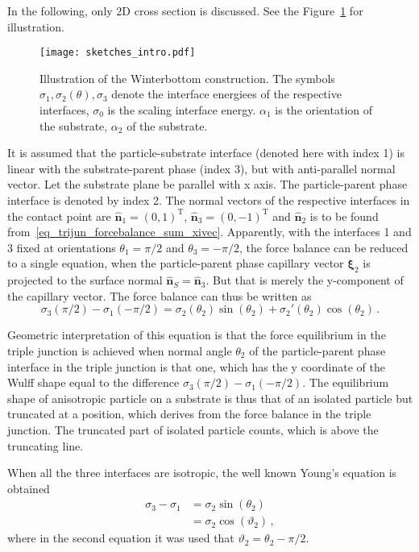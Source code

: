 In the following, only 2D cross section is discussed. See the Figure~\ref{fig_winterbottom_explained_intro} for illustration.
\begin{figure}
	\centering
	\texttt{[image: sketches\_intro.pdf]}
	\caption[Illustration of the Winterbottom construction]{Illustration of the Winterbottom construction. The symbols $\sigma_1, \sigma_2(\theta), \sigma_3$ denote the interface energiees of the respective interfaces, $\sigma_0$ is the scaling interface energy.  $\alpha_1$ is the orientation of the substrate, $\alpha_2$ of the substrate.}
	\label{fig_winterbottom_explained_intro}
\end{figure}
 It is assumed that the particle-substrate interface (denoted here with index 1) is linear with the substrate-parent phase (index 3), but with anti-parallel normal vector. Let the substrate plane be parallel with x axis. The particle-parent phase interface is denoted by index 2. The normal vectors of the respective interfaces in the contact point are $\hat{\bm{n}}_1=(0,1)^{\mathrm{T}}$, $\hat{\bm{n}}_3=(0,-1)^{\mathrm{T}}$ and $\hat{\bm{n}}_2$ is to be found from~\eqref{eq_trijun_forcebalance_sum_xivec}. Apparently, with the interfaces 1 and 3 fixed at orientations $\theta_1=\pi/2$ and $\theta_3=-\pi/2$, the force balance can be reduced to a single equation, when the particle-parent phase capillary vector $\bm{\xi}_2$ is projected to the surface normal $\hat{\bm{n}}_S=\hat{\bm{n}}_3$. But that is merely the y-component of the capillary vector. The force balance can thus be written as
\begin{equation}\label{eq_youngs_eq_aniso}
    \sigma_{3}(\pi/2)-\sigma_1(-\pi/2)  
      = \sigma_2(\theta_2)\sin(\theta_2) + \sigma_2'(\theta_2)\cos(\theta_2) \,.
\end{equation}

Geometric interpretation of this equation is that the force equilibrium in the triple junction is achieved when normal angle $\theta_2$ of the particle-parent phase interface in the triple junction is that one, which has the y coordinate of the Wulff shape equal to the difference $\sigma_{3}(\pi/2)-\sigma_1(-\pi/2) $. The equilibrium shape of anisotropic particle on a substrate is thus that of an isolated particle but truncated at a position, which derives from the force balance in the triple junction. The truncated part of isolated particle counts, which is above the truncating line.

When all the three interfaces are isotropic, the well known Young's equation is obtained
\begin{align}
    \sigma_3-\sigma_1 &= \sigma_2\sin(\theta_2) \\
        &= \sigma_2\cos(\vartheta_2)
    \,,
\end{align}
where in the second equation it was used that $\vartheta_2=\theta_2-\pi/2$.

